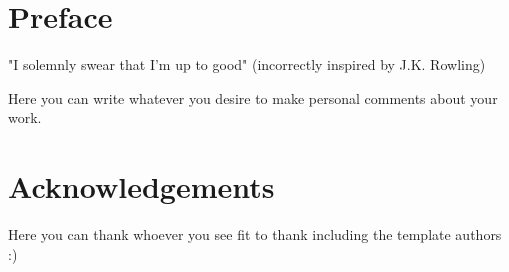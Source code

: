 
\chapter*{Preface}

\begin{center}
    "I solemnly swear that I'm up to good" (incorrectly inspired by J.K. Rowling)
\end{center}

Here you can write whatever you desire to make personal comments about your work.

\vspace{2cm}

\lipsum[1-2]

\vspace{5mm}

\newpage

{\let\clearpage\relax\chapter*{Acknowledgements}}%
Here you can thank whoever you see fit to thank including the template authors :)


\vspace{2cm}
\lipsum[1-2]